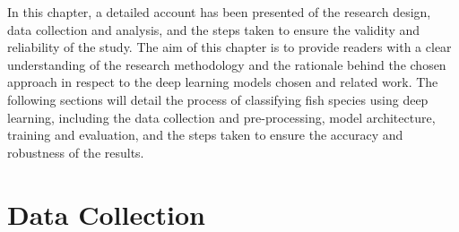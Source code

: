 

In this chapter, a detailed account has been presented of the research design, data collection and analysis, and the steps taken to ensure the validity and reliability of the study. The aim of this chapter is to provide readers with a clear understanding of the research methodology and the rationale behind the chosen approach in respect to the deep learning models chosen and related work. The following sections will detail the process of classifying fish species using deep learning, including the data collection and pre-processing, model architecture, training and evaluation, and the steps taken to ensure the accuracy and robustness of the results. 

\section{Data Collection}


